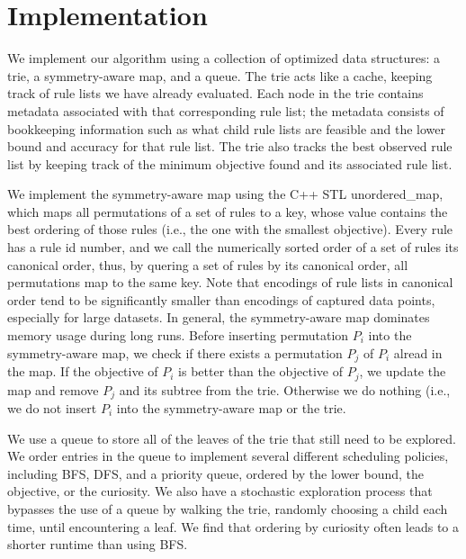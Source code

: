 \section{Implementation}
\label{sec:implementation}



We implement our algorithm using a collection of optimized data structures:
a trie, a symmetry-aware map, and a queue.
The trie acts like a cache, keeping track of rule lists we have already evaluated.
Each node in the trie contains metadata associated with that corresponding rule list;
the metadata consists of bookkeeping information such as what child rule lists are feasible and
the lower bound and accuracy for that rule list.
The trie also tracks the best observed rule list by keeping track of the minimum objective
found and its associated rule list.

We implement the symmetry-aware map using the C++ STL unordered\_map, which
maps all permutations of a set of rules to a key, whose value
contains the best ordering of those rules (i.e., the one with the smallest objective).
Every rule has a rule id number, and we call the numerically sorted order of a set of rules its
canonical order, thus, by quering a set of rules by its canonical order, all
permutations map to the same key.
%
Note that encodings of rule lists in canonical order tend to be
significantly smaller than encodings of captured data points,
especially for large datasets.
%
In general, the symmetry-aware map dominates memory usage during long runs.
Before inserting permutation $P_i$ into the symmetry-aware map, we check
if there exists a permutation $P_j$ of $P_i$ alread in the map.
If the objective of $P_i$ is better than the objective of $P_j$,
we update the map and remove $P_j$ and its subtree from the trie.
Otherwise we do nothing (i.e., we do not insert $P_i$ into the symmetry-aware map
or the trie.

We use a queue to store all of the leaves of the trie that still need to be explored.
We order entries in the queue to implement several different scheduling policies,
including BFS, DFS, and a priority queue, ordered by the lower bound, the objective, or the
curiosity.
We also have a stochastic exploration process that bypasses the use of a queue by walking
the trie, randomly choosing a child each time, until encountering a leaf.
We find that ordering by curiosity often leads to a shorter runtime than using BFS.

